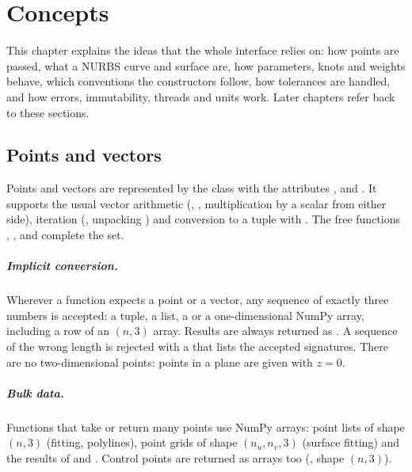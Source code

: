\chapter{Concepts}\label{ch:concepts}

This chapter explains the ideas that the whole interface relies on: how points are passed, what
a NURBS curve and surface are, how parameters, knots and weights behave, which conventions the
constructors follow, how tolerances are handled, and how errors, immutability, threads and units
work. Later chapters refer back to these sections.

\section{Points and vectors}\label{sec:concepts-vec3}

Points and vectors are represented by the class  with the attributes ,
 and . It supports the usual vector arithmetic (\code{+}, \code{-},
multiplication by a scalar from either side), iteration (, unpacking
) and conversion to a tuple with . The free functions
, ,  and  complete the set.

\paragraph{Implicit conversion.} Wherever a function expects a point or a vector, any sequence
of exactly three numbers is accepted: a tuple, a list, a  or a one-dimensional
NumPy array, including a row of an $(n,3)$ array. Results are always returned as .
A sequence of the wrong length is rejected with a  that lists the accepted
signatures. There are no two-dimensional points: points in a plane are given with $z=0$.

\paragraph{Bulk data.} Functions that take or return many points use NumPy arrays: point lists
of shape $(n,3)$ (fitting, polylines), point grids of shape $(n_u,n_v,3)$ (surface fitting) and
the results of  and . Control points are
returned as arrays too (, shape $(n,3)$).


